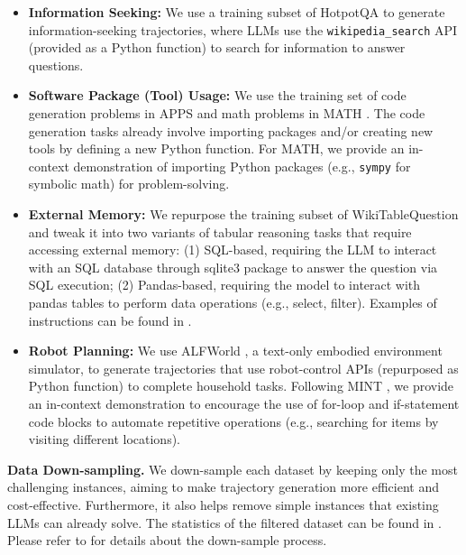 \begin{itemize}[noitemsep,topsep=0pt,parsep=0pt,partopsep=0pt,leftmargin=*]
    \item \textbf{Information Seeking:} We use a training subset of HotpotQA \citep{yang2018hotpotqa} to generate information-seeking trajectories, where LLMs use the \texttt{wikipedia\_search} API (provided as a Python function) to search for information to answer questions.
    
    \item \textbf{Software Package (Tool) Usage:} We use the training set of code generation problems in APPS \citep{hendrycks2021measuring} and math problems in MATH \citep{hendrycks2021math}. The code generation tasks already involve importing packages and/or creating new tools by defining a new Python function. For MATH, we provide an in-context demonstration of importing Python packages (e.g., \texttt{sympy} for symbolic math) for problem-solving.
    
    \item \textbf{External Memory:} We repurpose the training subset of WikiTableQuestion \citep{pasupat2015compositional} and tweak it into two variants of tabular reasoning tasks that require accessing external memory: (1) SQL-based, requiring the LLM to interact with an SQL database through sqlite3 package to answer the question via SQL execution; (2) Pandas-based, requiring the model to interact with pandas tables to perform data operations (e.g., select, filter). Examples of instructions can be found in .

    \item \textbf{Robot Planning:} We use ALFWorld \citep{shridhar2020alfworld}, a text-only embodied environment simulator, to generate trajectories that use robot-control APIs (repurposed as Python function) to complete household tasks. Following MINT \citep{wang2023mint}, we provide an in-context demonstration to encourage the use of for-loop and if-statement code blocks to automate repetitive operations (e.g., searching for items by visiting different locations).
    
\end{itemize}

\noindent \textbf{Data Down-sampling.}
% 
We down-sample each dataset by keeping only the most challenging instances, aiming to make trajectory generation more efficient and cost-effective. Furthermore, it also helps remove simple instances that existing LLMs can already solve.
The statistics of the filtered dataset can be found in . Please refer to  for details about the down-sample process.

